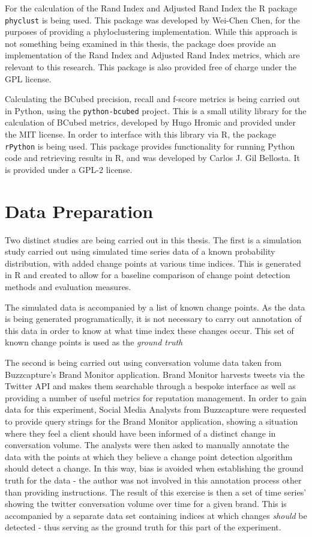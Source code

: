 \documentclass{uvamscse}	%
\begin{document}
For the calculation of the Rand Index and Adjusted Rand Index the \textsf{R} package \texttt{phyclust} is being used. This package was developed by Wei-Chen Chen, for the purposes of providing a phyloclustering implementation. While this approach is not something being examined in this thesis, the package does provide an implementation of the Rand Index and Adjusted Rand Index metrics, which are relevant to this research. This package is also provided free of charge under the GPL license.

Calculating the BCubed precision, recall and f-score metrics is being carried out in Python, using the \texttt{python-bcubed} project. This is a small utility library for the calculation of BCubed metrics, developed by Hugo Hromic and provided under the MIT license. In order to interface with this library via \textsf{R}, the package \texttt{rPython} is being used. This package provides functionality for running Python code and retrieving results in \textsf{R}, and was developed by Carlos J. Gil Bellosta. It is provided under a GPL-2 license.

\section{Data Preparation}

Two distinct studies are being carried out in this thesis. The first is a simulation study carried out using simulated time series data of a known probability distribution, with added change points at various time indices. This is generated in \textsf{R} and created to allow for a baseline comparison of change point detection methods and evaluation measures.

The simulated data is accompanied by a list of known change points. As the data is being generated programatically, it is not necessary to carry out annotation of this data in order to know at what time index these changes occur. This set of known change points is used as the \emph{ground truth} 

The second is being carried out using conversation volume data taken from Buzzcapture's Brand Monitor application. Brand Monitor harvests tweets via the Twitter API and makes them searchable through a bespoke interface as well as providing a number of useful metrics for reputation management. In order to gain data for this experiment, Social Media Analysts from Buzzcapture were requested to provide query strings for the Brand Monitor application, showing a situation where they feel a client should have been informed of a distinct change in conversation volume. The analysts were then asked to manually annotate the data with the points at which they believe a change point detection algorithm should detect a change. In this way, bias is avoided when establishing the ground truth for the data - the author was not involved in this annotation process other than providing instructions. The result of this exercise is then a set of time series' showing the twitter conversation volume over time for a given brand. This is accompanied by a separate data set containing indices at which changes \emph{should} be detected - thus serving as the ground truth for this part of the experiment.
\end{document}
